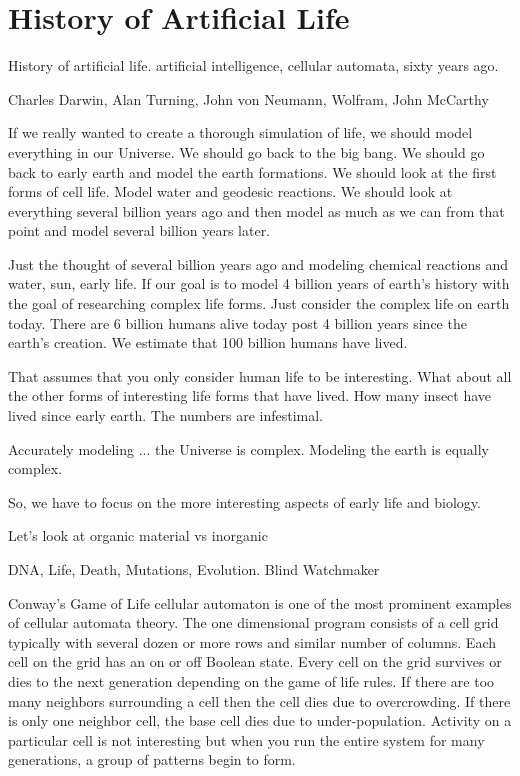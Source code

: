 
\section{History of Artificial Life}


History of artificial life.  artificial intelligence, cellular automata, sixty
years ago.

Charles Darwin, Alan Turning, John von Neumann, Wolfram, John McCarthy

If we really wanted to create a thorough simulation of life, we should model
everything in our Universe.  We should go back to the big bang.  We should go
back to early earth and model the earth formations.  We should look at the first
forms of cell life.  Model water and geodesic reactions.  We should look at
everything several billion years ago and then model as much as we can from that
point and model several billion years later.

Just the thought of several billion years ago and modeling chemical reactions
and water, sun, early life.  If our goal is to model 4 billion years of earth's
history with the goal of researching complex life forms.  Just consider the
complex life on earth today.  There are 6 billion humans alive today post 4
billion years since the earth's creation.  We estimate  that 100 billion humans
have lived.

That assumes that you only consider human life to be interesting.  What about
all the other forms of interesting life forms that have lived.  How many insect
have lived since early earth.  The numbers are infestimal.

Accurately modeling ... the Universe is complex.   Modeling the earth is equally
complex.

So, we have to focus on the more interesting aspects of early life and biology.

Let's look at organic material vs inorganic

DNA, Life, Death, Mutations, Evolution.  Blind Watchmaker


Conway's Game of Life cellular automaton is one of the most prominent examples
of cellular automata theory. The one dimensional program consists of a cell grid
typically with several dozen or more rows and similar number of columns. Each
cell on the grid has an on or off Boolean state. Every cell on the grid survives
or dies to the next generation depending on the game of life rules. If there are
too many neighbors surrounding a cell then the cell dies due to overcrowding. If
there is only one neighbor cell, the base cell dies due to under-population.
Activity on a particular cell is not interesting but when you run the entire
system for many generations, a group of patterns begin to form.

